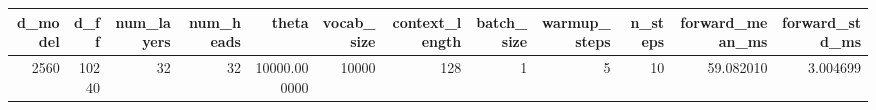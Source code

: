 \begin{tabular}{rrrrrrrrrrrr}
\toprule
d_model & d_ff & num_layers & num_heads & theta & vocab_size & context_length & batch_size & warmup_steps & n_steps & forward_mean_ms & forward_std_ms \\
\midrule
2560 & 10240 & 32 & 32 & 10000.000000 & 10000 & 128 & 1 & 5 & 10 & 59.082010 & 3.004699 \\
\bottomrule
\end{tabular}
